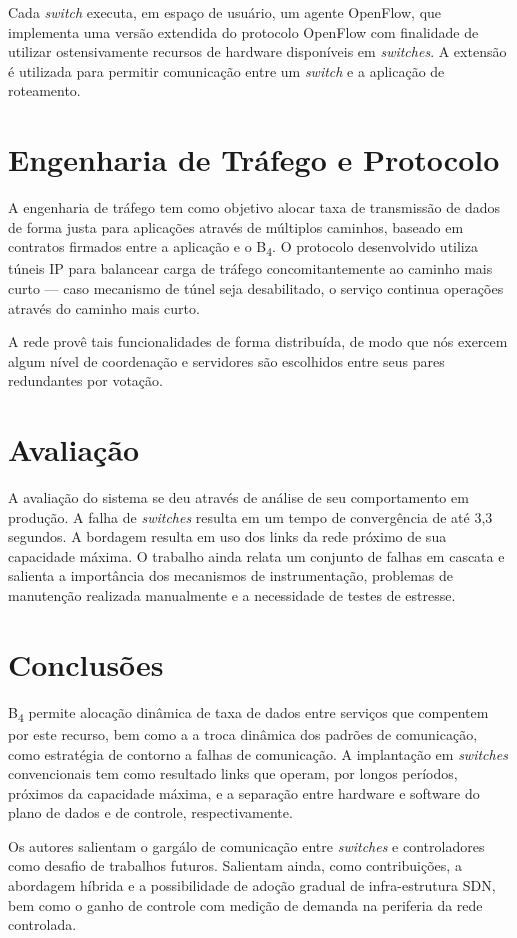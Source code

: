 Cada \textit{switch} executa, em espaço de usuário, um agente OpenFlow, que implementa uma versão extendida do protocolo OpenFlow com finalidade de utilizar ostensivamente recursos de hardware disponíveis em \textit{switches}. A extensão é utilizada para permitir comunicação entre um \textit{switch} e a aplicação de roteamento.


\section*{Engenharia de Tráfego e Protocolo}

A engenharia de tráfego tem como objetivo alocar taxa de transmissão de dados de forma justa para aplicações através de múltiplos caminhos, baseado em contratos firmados entre a aplicação e o \texorpdfstring{B\textsubscript{4}}{B4}. O protocolo desenvolvido utiliza túneis IP para balancear carga de tráfego concomitantemente ao caminho mais curto --- caso mecanismo de túnel seja desabilitado, o serviço continua operações através do caminho mais curto.

A rede provê tais funcionalidades de forma distribuída, de modo que nós exercem algum nível de coordenação e servidores são escolhidos entre seus pares redundantes por votação.


\section*{Avaliação}

A avaliação do sistema se deu através de análise de seu comportamento em produção. A falha de \textit{switches} resulta em um tempo de convergência de até 3,3 segundos. A bordagem resulta em uso dos links da rede próximo de sua capacidade máxima. O trabalho ainda relata um conjunto de falhas em cascata e salienta a importância dos mecanismos de instrumentação, problemas de manutenção realizada manualmente e a necessidade de testes de estresse.


\section*{Conclusões}

\texorpdfstring{B\textsubscript{4}}{B4} permite alocação dinâmica de taxa de dados entre serviços que compentem por este recurso, bem como a a troca dinâmica dos padrões de comunicação, como estratégia de contorno a falhas de comunicação. A implantação em \textit{switches} convencionais tem como resultado links que operam, por longos períodos, próximos da capacidade máxima, e a separação entre hardware e software do plano de dados e de controle, respectivamente.

Os autores salientam o gargálo de comunicação entre \textit{switches} e controladores como desafio de trabalhos futuros. Salientam ainda, como contribuições, a abordagem híbrida e a possibilidade de adoção gradual de infra-estrutura SDN, bem como o ganho de controle com medição de demanda na periferia da rede controlada.
